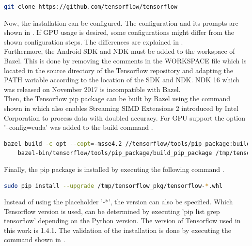 \begin{lstlisting}[caption=Cloning the tensorflow repository, label=list:clone_tensorflow, language=bash]
	git clone https://github.com/tensorflow/tensorflow		
\end{lstlisting}

Now, the installation can be configured. The configuration and its prompts are shown in . If GPU usage is desired, some configurations might differ from the shown configuration steps. The differences are explained in .\\

Furthermore, the Android SDK and NDK must be added to the workspace of Bazel. This is done by removing the comments in the WORKSPACE file which is located in the source directory of the Tensorflow repository and adapting the PATH variable according to the location of the SDK and NDK. NDK 16 which was released on November 2017 is incompatible with Bazel. \\

Then, the Tensorflow pip package can be built by Bazel using the command shown in  which also enables Streaming SIMD Extensions 2 introduced by Intel Corporation to process data with doubled accuracy. For GPU support the option '--config=cuda' was added to the build command \citep{GithubBazel}.

\begin{lstlisting}[caption=Building the Tensorflow pip package, label=list:pip_package, language=bash]
	bazel build -c opt --copt=-msse4.2 //tensorflow/tools/pip_package:build_pip_package
	bazel-bin/tensorflow/tools/pip_package/build_pip_package /tmp/tensorflow_pkg
\end{lstlisting}

Finally, the pip package is installed by executing the following command .

\begin{lstlisting}[caption=Installing the pip package, label=list:pip_install, language=bash]
	sudo pip install --upgrade /tmp/tensorflow_pkg/tensorflow-*.whl
\end{lstlisting}

Instead of using the placeholder '-*', the version can also be specified. Which Tensorflow version is used, can be determined by executing 'pip list \big \vert grep tensorflow' depending on the Python version. The version of Tensorflow used in this work is 1.4.1. The validation of the installation is done by executing the command shown in  \citep{TensorflowBazel}.

